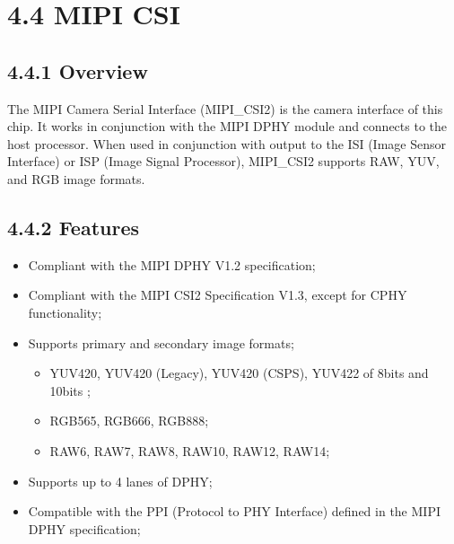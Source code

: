 \documentclass[letterpaper,10pt,openany,english]{sphinxmanual}
\begin{document}
\section{4.4  MIPI CSI}
\label{\detokenize{hardware:mipi-csi}}

\subsection{4.4.1 Overview}
\label{\detokenize{hardware:id4}}
\sphinxAtStartPar
The MIPI Camera Serial Interface (MIPI\_CSI2) is the camera interface of this chip. It works in conjunction with the MIPI DPHY module and connects to the host processor. When used in conjunction with output to the ISI (Image Sensor Interface) or ISP (Image Signal Processor), MIPI\_CSI2 supports RAW, YUV, and RGB image formats.


\subsection{4.4.2 Features}
\label{\detokenize{hardware:id5}}\begin{itemize}
\item {} 
\sphinxAtStartPar
Compliant with the MIPI D\sphinxhyphen{}PHY V1.2 specification;

\item {} 
\sphinxAtStartPar
Compliant with the MIPI CSI2 Specification V1.3, except for C\sphinxhyphen{}PHY functionality;

\item {} 
\sphinxAtStartPar
Supports primary and secondary image formats;
\begin{itemize}
\item {} 
\sphinxAtStartPar
YUV420, YUV420 (Legacy), YUV420 (CSPS), YUV422 of 8\sphinxhyphen{}bits and 10\sphinxhyphen{}bits ;

\item {} 
\sphinxAtStartPar
RGB565, RGB666, RGB888;

\item {} 
\sphinxAtStartPar
RAW6, RAW7, RAW8, RAW10, RAW12, RAW14;

\end{itemize}

\item {} 
\sphinxAtStartPar
Supports up to 4 lanes of D\sphinxhyphen{}PHY;

\item {} 
\sphinxAtStartPar
Compatible with the PPI (Protocol to PHY Interface) defined in the MIPI D\sphinxhyphen{}PHY specification;

\end{itemize}
\end{document}
